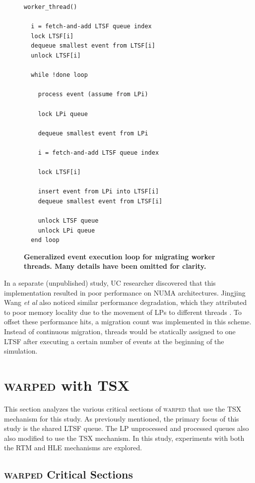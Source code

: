 \documentclass[11pt]{book}
\begin{document}
\begin{figure}
\begin{verbatim}
worker_thread()

  i = fetch-and-add LTSF queue index
  lock LTSF[i]
  dequeue smallest event from LTSF[i]
  unlock LTSF[i]

  while !done loop

    process event (assume from LPi)

    lock LPi queue
    
    dequeue smallest event from LPi

    i = fetch-and-add LTSF queue index

    lock LTSF[i]

    insert event from LPi into LTSF[i]
    dequeue smallest event from LTSF[i]

    unlock LTSF queue
    unlock LPi queue
  end loop
\end{verbatim}
\caption{\textbf{Generalized event execution loop for migrating worker threads.  Many
    details have been omitted for clarity.}}\label{migratinWorkerThreadAlgorithm}
\end{figure}

In a separate (unpublished) study, UC researcher discovered that this implementation
resulted in poor performance on NUMA architectures.  Jingjing Wang \emph{et al} also
noticed similar performance degradation, which they attributed to poor memory locality due
to the movement of LPs to different threads \cite{numa}.  To offset these performance
hits, a migration count was implemented in this scheme.  Instead of continuous migration,
threads would be statically assigned to one LTSF after executing a certain number of
events at the beginning of the simulation.


\chapter{\textsc{warped} with TSX}

This section analyzes the various critical sections of \textsc{warped} that use the TSX
mechanism for this study.  As previously mentioned, the primary focus of this study is the
shared LTSF queue.  The LP unprocessed and processed queues also also modified to use the
TSX mechanism.  In this study, experiments with both the RTM and HLE mechanisms are
explored. 

\section{\textsc{warped} Critical Sections}
\end{document}
